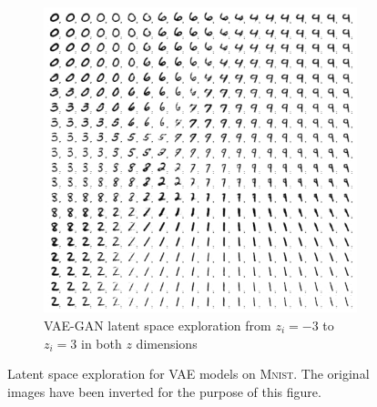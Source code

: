 \begin{figure}
\begin{subfigure}{.45\textwidth}
        \includegraphics[width=\textwidth]{images/latent_space_traversals/vae_gan_mnist.png}
        \caption{VAE-GAN latent space exploration from $z_i=-3$ to $z_i=3$ in both $z$ dimensions}
    \end{subfigure}
    \caption[VAE Models on \textsc{Mnist} - Latent Space Exploration]{Latent space exploration for \ac{VAE} models on \textsc{Mnist}. The original images have been inverted for the purpose of this figure.}
    \label{fig:mnist_latent_space_traversal_vae}
\end{figure}
